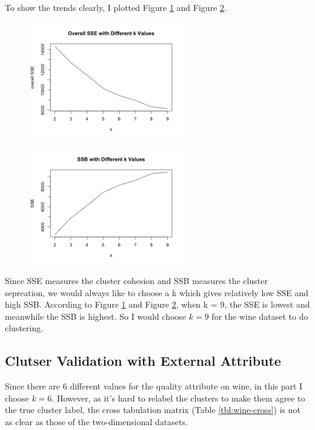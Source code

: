 \documentclass{article}
\begin{document}
		To show the trends clearly, I plotted Figure \ref{fig:wine-sse} and Figure \ref{fig:wine-ssb}.

		\begin{figure}[H]
		\centering
			\includegraphics[width = 0.6\textwidth]{wine-sse.png}
			\caption{}
			\label{fig:wine-sse}
		\end{figure}

		\begin{figure}[H]
		\centering
			\includegraphics[width = 0.6\textwidth]{wine-ssb.png}
			\caption{}
			\label{fig:wine-ssb}
		\end{figure}

		Since SSE measures the cluster cohesion and SSB measures the cluster sepreation, we would always like to choose a k which gives relatively low SSE and high SSB. According to Figure  \ref{fig:wine-sse} and Figure \ref{fig:wine-ssb}, when k = 9, the SSE is lowest and meanwhile the SSB is highest. So I would choose $k = 9$ for the wine dataset to do clustering.

	\subsection{Clutser Validation with External Attribute}
		Since there are 6 different values for the quality attribute on wine, in this part I choose $k=6$. However, as it's hard to relabel the clusters to make them agree to the true cluster label, the cross tabulation matrix (Table \ref{tbl:wine-cross}) is not as clear as those of the two-dimensional datasets. 
\end{document}
